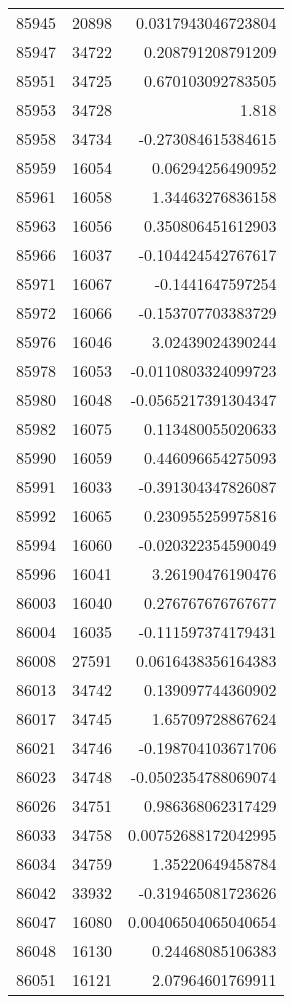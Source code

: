 \begin{tabular}{r | r | r}
85945 & 20898 & 0.0317943046723804 \\
85947 & 34722 & 0.208791208791209 \\
85951 & 34725 & 0.670103092783505 \\
85953 & 34728 & 1.818 \\
85958 & 34734 & -0.273084615384615 \\
85959 & 16054 & 0.06294256490952 \\
85961 & 16058 & 1.34463276836158 \\
85963 & 16056 & 0.350806451612903 \\
85966 & 16037 & -0.104424542767617 \\
85971 & 16067 & -0.1441647597254 \\
85972 & 16066 & -0.153707703383729 \\
85976 & 16046 & 3.02439024390244 \\
85978 & 16053 & -0.0110803324099723 \\
85980 & 16048 & -0.0565217391304347 \\
85982 & 16075 & 0.113480055020633 \\
85990 & 16059 & 0.446096654275093 \\
85991 & 16033 & -0.391304347826087 \\
85992 & 16065 & 0.230955259975816 \\
85994 & 16060 & -0.020322354590049 \\
85996 & 16041 & 3.26190476190476 \\
86003 & 16040 & 0.276767676767677 \\
86004 & 16035 & -0.111597374179431 \\
86008 & 27591 & 0.0616438356164383 \\
86013 & 34742 & 0.139097744360902 \\
86017 & 34745 & 1.65709728867624 \\
86021 & 34746 & -0.198704103671706 \\
86023 & 34748 & -0.0502354788069074 \\
86026 & 34751 & 0.986368062317429 \\
86033 & 34758 & 0.00752688172042995 \\
86034 & 34759 & 1.35220649458784 \\
86042 & 33932 & -0.319465081723626 \\
86047 & 16080 & 0.00406504065040654 \\
86048 & 16130 & 0.24468085106383 \\
86051 & 16121 & 2.07964601769911 \\

\end{tabular}

